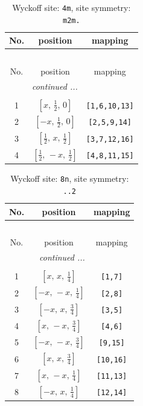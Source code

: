 \documentclass[fleqn,8pt]{jsarticle}
\begin{document}
\renewcommand{\arraystretch}{1.2}
\begin{longtable}{ccc}
\caption{Wyckoff site: {\tt 4m}, site symmetry: {\tt m2m.}}
 \\
 \hline \hline
No. & position & mapping \\ \hline \endfirsthead

\multicolumn{2}{l}{\tablename\ \thetable{}} \\
 \hline \hline
No. & position & mapping \\ \hline \endhead

 \hline \hline
\multicolumn{2}{r}{\footnotesize\it continued ...} \\ \endfoot

 \hline \hline
\multicolumn{2}{r}{} \\ \endlastfoot

1 & $\left[ x,\, \frac{1}{2},\, 0 \right]$ & {\tt [1,6,10,13]} \\ \hline
2 & $\left[ - x,\, \frac{1}{2},\, 0 \right]$ & {\tt [2,5,9,14]} \\ \hline
3 & $\left[ \frac{1}{2},\, x,\, \frac{1}{2} \right]$ & {\tt [3,7,12,16]} \\ \hline
4 & $\left[ \frac{1}{2},\, - x,\, \frac{1}{2} \right]$ & {\tt [4,8,11,15]} \\
\end{longtable}
\renewcommand{\arraystretch}{1.2}
\begin{longtable}{ccc}
\caption{Wyckoff site: {\tt 8n}, site symmetry: {\tt ..2}}
 \\
 \hline \hline
No. & position & mapping \\ \hline \endfirsthead

\multicolumn{2}{l}{\tablename\ \thetable{}} \\
 \hline \hline
No. & position & mapping \\ \hline \endhead

 \hline \hline
\multicolumn{2}{r}{\footnotesize\it continued ...} \\ \endfoot

 \hline \hline
\multicolumn{2}{r}{} \\ \endlastfoot

1 & $\left[ x,\, x,\, \frac{1}{4} \right]$ & {\tt [1,7]} \\ \hline
2 & $\left[ - x,\, - x,\, \frac{1}{4} \right]$ & {\tt [2,8]} \\ \hline
3 & $\left[ - x,\, x,\, \frac{3}{4} \right]$ & {\tt [3,5]} \\ \hline
4 & $\left[ x,\, - x,\, \frac{3}{4} \right]$ & {\tt [4,6]} \\ \hline
5 & $\left[ - x,\, - x,\, \frac{3}{4} \right]$ & {\tt [9,15]} \\ \hline
6 & $\left[ x,\, x,\, \frac{3}{4} \right]$ & {\tt [10,16]} \\ \hline
7 & $\left[ x,\, - x,\, \frac{1}{4} \right]$ & {\tt [11,13]} \\ \hline
8 & $\left[ - x,\, x,\, \frac{1}{4} \right]$ & {\tt [12,14]} \\
\end{longtable}
\end{document}
